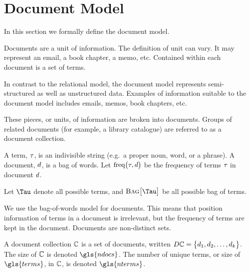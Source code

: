 \section{Document Model}
\label{sec:document-model}
	In this section we formally define the document model.
	
	Documents are a unit of information.  The definition of unit can vary.  It may represent an email, a book chapter, a memo, etc.  Contained within each document is a set of terms.
	
	In contrast to the relational model, the document model represents semi-structured as well as unstructured data.  Examples of information suitable to the document model includes emails, memos, book chapters, etc.
	
	These pieces, or units, of information are broken into documents.  Groups of related documents (for example, a library catalogue) are referred to as a document collection.

	\begin{defn}
	\label{def:document}
		A term, $\tau$, is an indivisible string (e.g.~a proper noun, word, or a phrase).  A document, $d$, is a bag of words.  Let $\operatorname{freq}\bigl(\tau, d\bigr)$ be the frequency of terms $\tau$ in document $d$.
		
		Let $\terms$ denote all possible terms, and $\bag{\terms}$ be all possible bag of terms.
	\end{defn}
	
	\begin{remark}
		We use the bag-of-words model for documents.  This means that position information of terms in a document is irrelevant, but the frequency of terms are kept in the document.  Documents are non-distinct sets.
	\end{remark}
	
	\begin{defn}
	\label{def:document-collection}
		A document collection $\mathbb{C}$ is a set of documents, written $D\mathbb{C} = \bigl\{d_1, d_2, \dotsc, d_k\bigr\}$.  The size of $\mathbb{C}$ is denoted $\gls{ndocs}$.  The number of unique terms, or size of $\gls{terms}$, in $\mathbb{C}$, is denoted $\gls{nterms}$.
	\end{defn}
	
